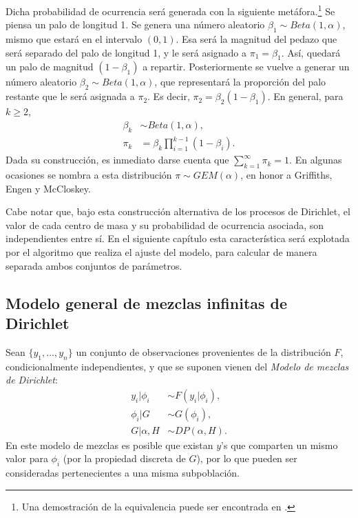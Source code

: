 Dicha probabilidad de ocurrencia ser\'a generada con la siguiente met\'afora.\footnote{Una demostraci\'on de la equivalencia puede ser encontrada en \cite{Paisley_SB}.} Se piensa un palo de longitud 1. Se genera una n\'umero aleatorio $\beta_1 \sim Beta(1,\alpha)$, mismo que estar\'a en el intervalo $(0,1)$. Esa ser\'a la magnitud del pedazo que ser\'a separado del palo de longitud 1, y le ser\'a asignado a $\pi_1 = \beta_1$. As\'i, quedar\'a un palo de magnitud $(1-\beta_1)$ a repartir. Posteriormente se vuelve a generar un n\'umero aleatorio $\beta_2 \sim Beta(1,\alpha)$, que representar\'a la proporci\'on del palo restante que le ser\'a asignada a $\pi_2$. Es decir, $\pi_2 = \beta_2(1-\beta_1)$. En general, para $k \geq 2$,
\begin{equation*}
\begin{aligned}
   \beta_k &\sim Beta(1,\alpha),\\
   \pi_k &= \beta_k \prod_{i=1}^{k-1}(1 - \beta_i).
\end{aligned}
\end{equation*}
Dada su construcci\'on, es inmediato darse cuenta que $\sum_{k=1}^\infty \pi_k = 1$. En algunas ocasiones se nombra a esta distribuci\'on $\pi \sim GEM(\alpha)$, en honor a Griffiths, Engen y McCloskey.

Cabe notar que, bajo esta construcci\'on alternativa de los procesos de Dirichlet, el valor de cada centro de masa y su probabilidad de ocurrencia asociada, son independientes entre s\'i. En el siguiente cap\'itulo esta caracter\'istica ser\'a explotada por el algoritmo que realiza el ajuste del modelo, para calcular de manera separada ambos conjuntos de par\'ametros.

\subsection{Modelo general de mezclas infinitas de Dirichlet}

Sean $\{y_1,...,y_n\}$ un conjunto de observaciones provenientes de la distribuci\'on $F$, condicionalmente independientes, y que se suponen vienen del \textit{Modelo de mezclas de Dirichlet}:
\begin{equation*}
\begin{aligned}
   y_i | \phi_i &\sim F(y_i | \phi_i), \\
   \phi_i | G &\sim G(\phi_i), \\
   G | \alpha, H &\sim DP(\alpha,H).
\end{aligned}
\end{equation*}
En este modelo de mezclas es posible que existan $y$'s que comparten un mismo valor para $\phi_i$ (por la propiedad discreta de $G$), por lo que pueden ser consideradas pertenecientes a una misma subpoblaci\'on.


